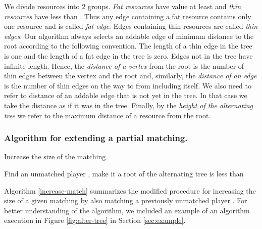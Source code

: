 \documentclass{llncs}
\begin{document}
We divide resources into 2 groups. \emph{Fat resources} have value at least
 and \emph{thin resources} have less than . Thus any edge
containing a fat resource contains only one resource and is called \emph{fat
edge}. Edges containing thin resources are called \emph{thin edges}. Our
algorithm always selects an addable edge of minimum distance to the root 
according to the following convention. The length of a thin edge in the tree is
one and the length of a fat edge in the tree is zero. Edges not in the tree have
infinite length. Hence, the \emph{distance of a vertex} from the root is the
number of thin edges between the vertex and the root and, similarly, the
\emph{distance of an edge } is the number of thin edges on the way to 
from  including  itself. We also need to refer to distance of an
addable edge that is not yet in the tree. In that case we take the distance as
if it was in the tree. Finally, by the \emph{height of the alternating tree} we
refer to the maximum distance of a resource from the root.

\subsubsection{Algorithm for extending a partial matching.}
\begin{algorithm}[h!]
\DontPrintSemicolon
\caption{Increase the size of the matching}
\label{increase-match}
\BlankLine
 Find an unmatched player , make it a root of the alternating tree\;
\Return  is less than 
\end{algorithm}

Algorithm \ref{increase-match} summarizes the modified procedure for increasing
the size of a given matching by also matching a previously unmatched player
. For better understanding of the algorithm, we included an example of an
algorithm execution in Figure \ref{fig:alter-tree} in Section
\ref{sec:example}.
\end{document}
